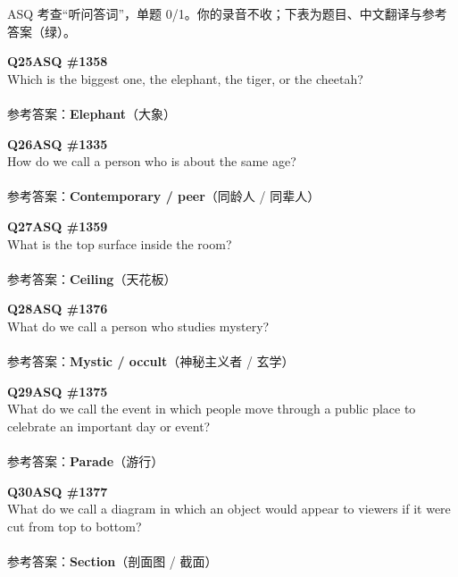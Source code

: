 \begin{notebox}
{\footnotesize\color{gray}ASQ 考查“听问答词”，单题 0/1。你的录音不收；下表为题目、中文翻译与参考答案（绿）。}
\smallskip\par
\textbf{Q25\quad ASQ \#1358}\\
Which is the biggest one, the elephant, the tiger, or the cheetah?\\
\\
参考答案：{\color{cFix}\textbf{Elephant}}（大象）
\par\smallskip
\textbf{Q26\quad ASQ \#1335}\\
How do we call a person who is about the same age?\\
\\
参考答案：{\color{cFix}\textbf{Contemporary / peer}}（同龄人 / 同辈人）
\par\smallskip
\textbf{Q27\quad ASQ \#1359}\\
What is the top surface inside the room?\\
\\
参考答案：{\color{cFix}\textbf{Ceiling}}（天花板）
\par\smallskip
\textbf{Q28\quad ASQ \#1376}\\
What do we call a person who studies mystery?\\
\\
参考答案：{\color{cFix}\textbf{Mystic / occult}}（神秘主义者 / 玄学）
\par\smallskip
\textbf{Q29\quad ASQ \#1375}\\
What do we call the event in which people move through a public place to celebrate an important day or event?\\
\\
参考答案：{\color{cFix}\textbf{Parade}}（游行）
\par\smallskip
\textbf{Q30\quad ASQ \#1377}\\
What do we call a diagram in which an object would appear to viewers if it were cut from top to bottom?\\
\\
参考答案：{\color{cFix}\textbf{Section}}（剖面图 / 截面）
\end{notebox}
